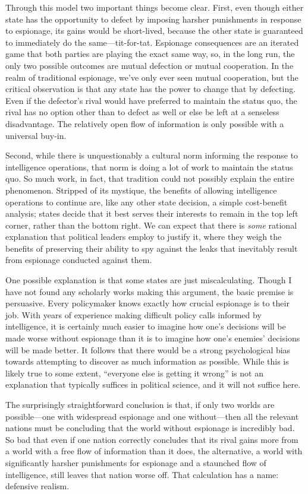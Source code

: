 \documentclass[14pt]{extarticle}
\begin{document}
Through this model two important things become clear. First, even though either state has the opportunity to defect by imposing harsher punishments in response to espionage, its gains would be short-lived, because the other state is guaranteed to immediately do the same---tit-for-tat. Espionage consequences are an iterated game that both parties are playing the exact same way, so, in the long run, the only two possible outcomes are mutual defection or mutual cooperation. In the realm of traditional espionage, we've only ever seen mutual cooperation, but the critical observation is that any state has the power to change that by defecting. Even if the defector's rival would have preferred to maintain the status quo, the rival has no option other than to defect as well or else be left at a senseless disadvantage. The relatively open flow of information is only possible with a universal buy-in.

Second, while there is unquestionably a cultural norm informing the response to intelligence operations, that norm is doing a lot of work to maintain the status quo. So much work, in fact, that tradition could not possibly explain the entire phenomenon. Stripped of its mystique, the benefits of allowing intelligence operations to continue are, like any other state decision, a simple cost-benefit analysis; states decide that it best serves their interests to remain in the top left corner, rather than the bottom right. We can expect that there is \emph{some} rational explanation that political leaders employ to justify it, where they weigh the benefits of preserving their ability to spy against the leaks that inevitably result from espionage conducted against them.

One possible explanation is that some states are just miscalculating. Though I have not found any scholarly works making this argument, the basic premise is persuasive. Every policymaker knows exactly how crucial espionage is to their job. With years of experience making difficult policy calls informed by intelligence, it is certainly much easier to imagine how one's decisions will be made worse without espionage than it is to imagine how one's enemies' decisions will be made better. It follows that there would be a strong psychological bias towards attempting to discover as much information as possible. While this is likely true to some extent, \enquote{everyone else is getting it wrong} is not an explanation that typically suffices in political science, and it will not suffice here.

The surprisingly straightforward conclusion is that, if only two worlds are possible---one with widespread espionage and one without---then all the relevant nations must be concluding that the world without espionage is incredibly bad. So bad that even if one nation correctly concludes that its rival gains more from a world with a free flow of information than it does, the alternative, a world with significantly harsher punishments for espionage and a staunched flow of intelligence, still leaves that nation worse off. That calculation has a name: defensive realism.
\end{document}
